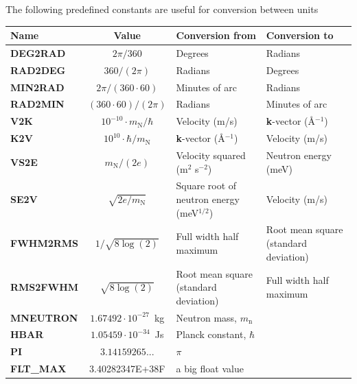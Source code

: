 The following predefined constants are useful for conversion
between units
\def\textvb#1{\textbf{#1}\index{#1 (constant)@\texttt{#1} (constant)|textbf}}
\begin{center}
\begin{tabular}{|l|c|p{}|p{}|}
\hline
Name & Value & Conversion from & Conversion to \\ \hline
\textvb{DEG2RAD} & $2 \pi / 360$ & Degrees & Radians \\
\textvb{RAD2DEG} & $360 / (2 \pi)$ & Radians & Degrees \\
\textvb{MIN2RAD} & $2 \pi / (360 \cdot 60)$
  & Minutes of arc & Radians \\
\textvb{RAD2MIN} & $(360\cdot 60) / (2 \pi)$
  & Radians & Minutes of arc \\
\textvb{V2K} & $10^{-10} \cdot m_\mathrm{N}/\hbar$
  & Velocity (m/s) & \textbf{k}-vector (\AA$^{-1}$) \\
\textvb{K2V} & $10^{10} \cdot \hbar / m_\mathrm{N}$
  & \textbf{k}-vector (\AA$^{-1}$) & Velocity (m/s) \\
\textvb{VS2E} & $m_\mathrm{N} / (2 e)$
  & Velocity squared (m$^2$ s$^{-2}$) & Neutron energy (meV) \\
\textvb{SE2V} & $\sqrt{2 e/m_\mathrm{N}}$
  & Square root of neutron energy (meV$^{1/2}$) & Velocity (m/s) \\
\textvb{FWHM2RMS} & $1/\sqrt{8\log(2)}$
  & Full width half maximum & Root mean square (standard deviation) \\
\textvb{RMS2FWHM} & $\sqrt{8\log(2)}$
  & Root mean square (standard deviation) & Full width half maximum \\
\textvb{MNEUTRON} & $1.67492 \cdot 10^{-27}$~kg
  & Neutron mass, $m_\mathrm{n}$ & \\
\textvb{HBAR} & $1.05459 \cdot 10^{-34}$~Js
  & Planck constant, $\hbar$ & \\
\textvb{PI} & $3.14159265...$
  & $\pi$ & \\
\textvb{FLT\_MAX} & 3.40282347E+38F
  & a big float value & \\
\hline
\end{tabular}
\end{center}
